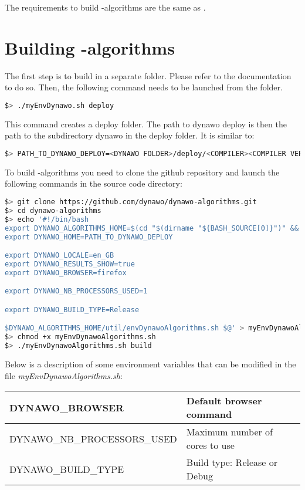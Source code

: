\documentclass[a4paper, 12pt]{report}
\begin{document}
The requirements to build \Dynawo-algorithms are the same as \Dynawo.

\section[Building Dynawo-algorithms]{Building \Dynawo-algorithms}
\label{Dynawo_algorithms_Installation_Documentation_Building_Dynawo_algorithm}
The first step is to build \Dynawo in a separate folder. Please refer to the \Dynawo documentation to do so.
Then, the following command needs to be launched from the \Dynawo folder.

\begin{lstlisting}[language=bash]
$> ./myEnvDynawo.sh deploy
\end{lstlisting}

This command creates a deploy folder. The path to dynawo deploy is then the path to the subdirectory dynawo in the deploy folder. It is similar to:

\begin{lstlisting}[language=bash]
$> PATH_TO_DYNAWO_DEPLOY=<DYNAWO FOLDER>/deploy/<COMPILER><COMPILER VERSION>/shared/dynawo/
\end{lstlisting}

To build \Dynawo-algorithms you need to clone the github repository and launch the following commands in the source code directory:

\begin{lstlisting}[language=bash]
$> git clone https://github.com/dynawo/dynawo-algorithms.git
$> cd dynawo-algorithms
$> echo '#!/bin/bash
export DYNAWO_ALGORITHMS_HOME=$(cd "$(dirname "${BASH_SOURCE[0]}")" && pwd)
export DYNAWO_HOME=PATH_TO_DYNAWO_DEPLOY

export DYNAWO_LOCALE=en_GB
export DYNAWO_RESULTS_SHOW=true
export DYNAWO_BROWSER=firefox

export DYNAWO_NB_PROCESSORS_USED=1

export DYNAWO_BUILD_TYPE=Release

$DYNAWO_ALGORITHMS_HOME/util/envDynawoAlgorithms.sh $@' > myEnvDynawoAlgorithms.sh
$> chmod +x myEnvDynawoAlgorithms.sh
$> ./myEnvDynawoAlgorithms.sh build
\end{lstlisting}

Below is a description of some environment variables that can be modified in the file \textit{myEnvDynawoAlgorithms.sh}:

\begin{center}
\begin{tabular}{|l|l|}
  \hline
   DYNAWO\_BROWSER & Default browser command \\
  \hline
   DYNAWO\_NB\_PROCESSORS\_USED & Maximum number of cores to use \\
  \hline
   DYNAWO\_BUILD\_TYPE & Build type: Release or Debug \\
  \hline
\end{tabular}
\end{center}
\end{document}
